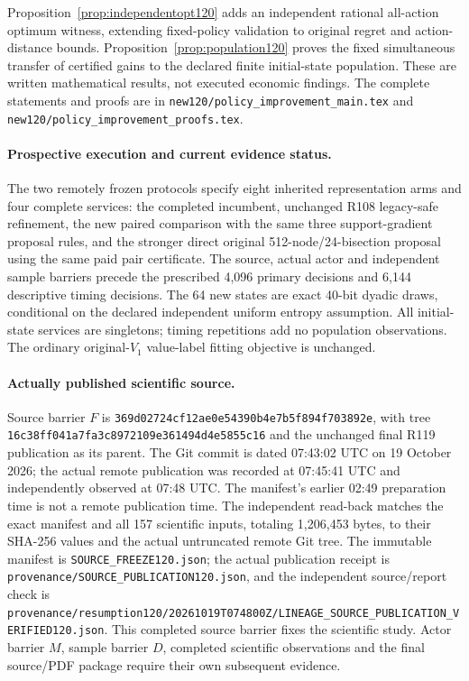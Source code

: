Proposition~\ref{prop:independentopt120} adds an independent rational
all-action optimum witness, extending fixed-policy validation to original
regret and action-distance bounds. Proposition~\ref{prop:population120}
proves the fixed simultaneous transfer of certified gains to the declared
finite initial-state population. These are written mathematical results,
not executed economic findings. The complete statements and proofs are in
\nolinkurl{new120/policy_improvement_main.tex} and
\nolinkurl{new120/policy_improvement_proofs.tex}.

\paragraph{Prospective execution and current evidence status.}
The two remotely frozen protocols specify eight inherited representation
arms and four complete services: the completed incumbent, unchanged R108
legacy-safe refinement, the new paired comparison with the same three
support-gradient proposal rules, and the stronger direct original
512-node/24-bisection proposal using the same paid pair certificate.
The source, actual actor and independent sample barriers precede the
prescribed 4,096 primary decisions and 6,144 descriptive timing decisions.
The 64 new states are exact 40-bit dyadic draws, conditional on the
declared independent uniform entropy assumption. All initial-state
services are singletons; timing repetitions add no population observations.
The ordinary original-$V_1$ value-label fitting objective is unchanged.

\paragraph{Actually published scientific source.}
Source barrier $F$ is \nolinkurl{369d02724cf12ae0e54390b4e7b5f894f703892e},
with tree \nolinkurl{16c38ff041a7fa3c8972109e361494d4e5855c16}
and the unchanged final R119 publication as its parent. The Git commit is
dated 07:43:02 UTC on 19 October 2026; the actual remote publication was
recorded at 07:45:41 UTC and independently observed at 07:48 UTC.
The manifest's earlier 02:49 preparation time is not a remote publication
time. The independent read-back matches the exact manifest and all 157
scientific inputs, totaling 1,206,453 bytes, to their SHA-256 values and
the actual untruncated remote Git tree. The immutable manifest is
\nolinkurl{SOURCE_FREEZE120.json}; the actual publication receipt is
\nolinkurl{provenance/SOURCE_PUBLICATION120.json}, and the independent
source/report check is
\nolinkurl{provenance/resumption120/20261019T074800Z/LINEAGE_SOURCE_PUBLICATION_VERIFIED120.json}.
This completed source barrier fixes the scientific study. Actor barrier
$M$, sample barrier $D$, completed scientific observations and the final
source/PDF package require their own subsequent evidence.

